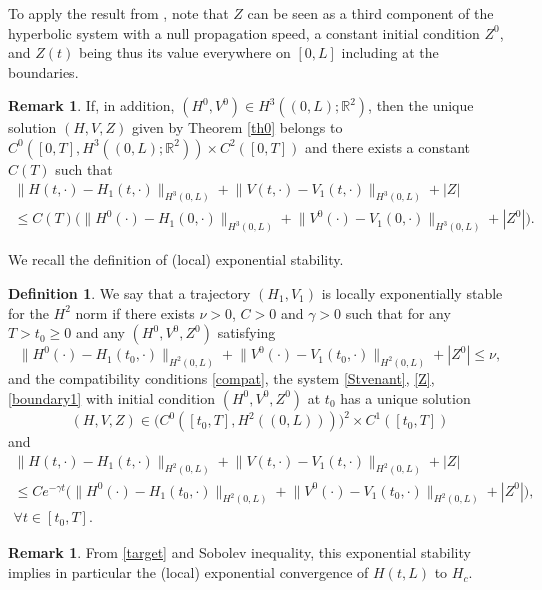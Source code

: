 \documentclass[JEP,XML,SOM,Unicode]{cedram}
\theoremstyle{definition}
\newtheorem{defn}[thm]{Definition}
\newtheorem{rmk}[thm]{Remark}
\begin{document}
To apply the result from \cite{Wang}, note that $Z$ can be seen as a third component of the hyperbolic system with a null propagation speed, a constant initial condition $Z^{0}$, and
$Z(t)$ being thus its value everywhere {on $[0,L]$} including at the boundaries.
\begin{rmk}
\label{r0}
If, in addition, $(H^{0},V^{0})\in H^{3}((0,L);\mathbb{R}^{2})$, then the unique solution $(H,V,Z)$ given by Theorem \ref{th0} belongs to $C^{0}([0,T],H^{3}((0,L);\mathbb{R}^{2}))\times C^{2}([0,T])$ and there exists
a constant $C(T)$ such that
\begin{multline}
\lVert H(t,\cdot)-H_{1}(t,\cdot)\rVert_{H^{3}{(0,L)}}+\lVert V(t,\cdot)-V_{1}(t,\cdot)\rVert_{H^{3}{(0,L)}}+|Z|\\
\leq C(T)\bigl(\lVert H^{0}(\cdot)-H_{1}(0,\cdot)\rVert_{H^{3}{(0,L)}}+\lVert V^{0}(\cdot)-V_{1}(0,\cdot)\rVert_{H^{3}{(0,L)}}+|Z^{0}|\bigr).
\end{multline}
\end{rmk}
We recall the definition of {(local)} exponential stability.
\begin{defn}
\label{defexpstab}
We say that a trajectory $(H_{1},V_{1})$ is {locally} exponentially stable for the $H^{2}$ norm if there exists $\nu>0$, $C>0$ and $\gamma>0$ such that for any $T>t_{0}\geq 0$ and any $(H^{0},V^{0},Z^{0})$ satisfying
\begin{equation*}
\lVert H^{0}(\cdot)-H_{1}(t_{0},\cdot)\rVert_{H^{2}(0,L)}+\lVert V^{0}(\cdot)-V_{1}(t_{0},\cdot)\rVert_{H^{2}(0,L)}+|Z^{0}|\leq \nu,
\end{equation*}
and the compatibility conditions \eqref{compat}, the system \eqref{Stvenant}, \eqref{Z}, \eqref{boundary1} {with initial condition $(H^{0},V^{0},Z^{0})$ at $t_{0}$} has a unique solution
\[
(H,V,Z)\in \bigl(C^{0}([t_{0},T],H^{2}((0,L)))\bigr)^{2}\times C^{1}([t_{0},T])
\]
and
\begin{multline*}
\lVert H(t,\cdot)-H_{1}(t,\cdot)\rVert_{H^{2}(0,L)}+\lVert V(t,\cdot)-V_{1}(t,\cdot)\rVert_{H^{2}(0,L)}+|Z|\\
\leq Ce^{-\gamma t}\bigl(\lVert H^{0}(\cdot)-H_{1}(t_{0},\cdot)\rVert_{H^{2}(0,L)}+\lVert V^{0}(\cdot)-V_{1}(t_{0},\cdot)\rVert_{H^{2}(0,L)}+|Z^{0}|\bigr),\\ \forall t\in[t_{0},T].
\end{multline*}
\end{defn}
\begin{rmk}
From \eqref{target} and Sobolev inequality, this exponential stability implies in particular the {(local)} exponential convergence of $H(t,L)$ to $H_{c}$.
\end{rmk}
\end{document}
